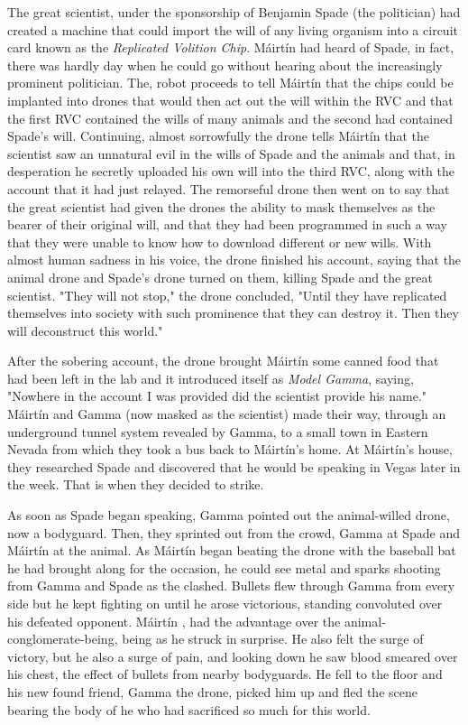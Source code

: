 \documentclass[12pt]{article}
\newcommand{\mc}{M\'airt\'in}
\newcommand{\mcs}{M\'airt\'in }
\begin{document}
\begin{flushleft}
The great scientist, under the sponsorship of Benjamin Spade (the politician) had created a machine
that could import the will of any living organism into a circuit card known as the \emph{Replicated Volition Chip}.
\mcs had heard of Spade, in fact, there was hardly day when he could go without hearing about the increasingly
prominent politician. The, robot proceeds to tell \mcs that the chips could be implanted into drones that would then act out
the will within the RVC and that the first RVC contained the wills of many animals and the second had contained Spade's
will. Continuing, almost sorrowfully the drone tells \mcs that the scientist saw an unnatural evil in the wills of Spade and the
animals and that, in desperation he secretly uploaded his own will into the third RVC, along with the account that
it had just relayed. The remorseful drone then went on to say that the great scientist had given the drones the ability
to mask themselves as the bearer of their original will, and that they had been programmed in such a way that they
were unable to know how to download different or new wills. With almost human sadness in his voice, the drone
finished his account, saying that the animal drone and Spade's drone turned on them, killing Spade and the great scientist.
"They will not stop," the drone concluded, "Until they have replicated themselves into society with such prominence that
they can destroy it. Then they will deconstruct this world."

After the sobering account, the drone brought \mcs some canned food that had been left in the lab and it introduced itself
as \emph{Model Gamma}, saying, "Nowhere in the account I was provided did the scientist provide his name." \mcs and
Gamma (now masked as the scientist) made their way, through an underground tunnel system revealed by Gamma, to
a small town in Eastern Nevada from which they took a bus back to \mc's home. At \mc's house, they researched Spade and
discovered that he would be speaking in Vegas later in the week. That is when they decided to strike.

As soon as Spade began speaking, Gamma pointed out the animal-willed drone, now a bodyguard. Then, they sprinted out from the crowd,
Gamma at Spade and \mcs at the animal. As \mcs began beating the drone with the baseball bat he had brought along for the
occasion, he could see metal and sparks shooting from Gamma and Spade as the clashed. Bullets flew through Gamma from every side
but he kept fighting on until he arose victorious, standing convoluted over his defeated opponent. \mcs, had the advantage over
the animal-conglomerate-being, being as he struck in surprise. He also felt the surge of victory, but he also
a surge of pain, and looking down he saw blood smeared over his chest, the effect of bullets from nearby bodyguards. He fell to the
floor and his new found friend, Gamma the drone, picked him up and fled the scene bearing the body of he who had sacrificed
so much for this world.


\end{flushleft}
\end{document}
